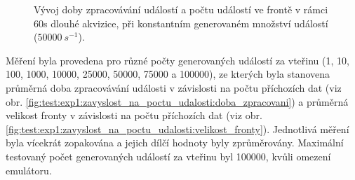 \begin{figure}[h]
    \centering

    \caption{Vývoj doby zpracovávání událostí a počtu událostí ve frontě v rámci \unit{60}{s} dlouhé akvizice, při konstantním generovaném množství událostí ($50000~s^{-1}$).}
    \label{fig:test:exp1:jedna_akvizice_50k_udalosti}
\end{figure}

Měření byla provedena pro různé počty generovaných událostí za vteřinu (1, 10, 100, 1000, 10000, 25000, 50000, 75000 a 100000), ze kterých byla stanovena průměrná doba zpracovávání události v závislosti na počtu příchozích dat (viz obr. \ref{fig:test:exp1:zavyslost_na_poctu_udalosti:doba_zpracovani}) a průměrná velikost fronty v závislosti na počtu příchozích dat (viz obr. \ref{fig:test:exp1:zavyslost_na_poctu_udalosti:velikost_fronty}). Jednotlivá měření byla vícekrát zopakována a jejich dílčí hodnoty byly zprůměrovány. Maximální testovaný počet generovaných událostí za vteřinu byl 100000, kvůli omezení emulátoru.

